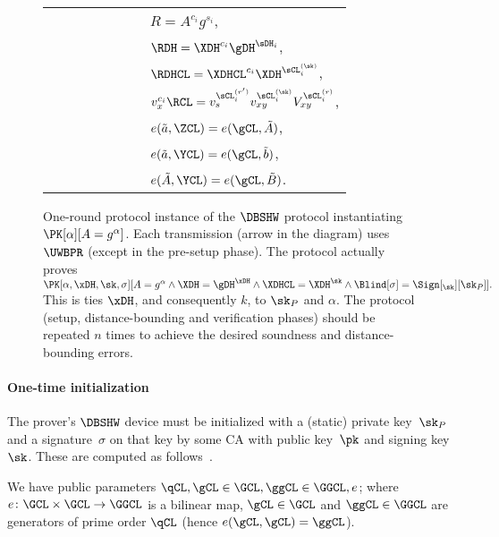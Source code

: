 \begin{figure*}
\begin{tabular}{p{0.40\linewidth}cp{0.40\linewidth}}
    &
    & \(R = A^{c_i} g^{s_i}\),
    \\

    &
    & \(\RDH = \XDH^{c_i} \gDH^{\sDH_i}\),
    \\

    &
    & \(\RDHCL = \XDHCL^{c_i} \XDH^{\sCL_i^{(\sk)}}\),
    \\

    &
    & \(v_x^{c_i} \RCL =
          v_s^{\sCL_i^{(r')}} v_{xy}^{\sCL_i^{(\sk)}} V_{xy}^{\sCL_i^{(r)}}\),
    \\

    &
    & \(e(\tilde a, \ZCL) = e(\gCL, \tilde A)\),
    \\

    &
    & \(e(\tilde a, \YCL) = e(\gCL, \tilde b)\),
    \\

    &
    & \(e(\tilde A, \YCL) = e(\gCL, \tilde B)\).
    \\

  \end{tabular}
  \caption{%
    One-round protocol instance of the \(\DBSHW\) protocol instantiating 
    \(\PK[\alpha][A = g^\alpha]\).
    Each transmission (arrow in the diagram) uses \(\UWBPR\) (except in the 
    pre-setup phase).
    The protocol actually proves \(
      \PK[\alpha, \xDH, \sk, \sigma][
        A = g^\alpha \land
        \XDH = \gDH^{\xDH} \land
        \XDHCL = \XDH^{\sk} \land
        \Blind[\sigma] = \Sign[_{\sk}][\sk_P]
      ].
    \)
    This is ties \(\xDH\), and consequently \(k\), to \(\sk_P\) and \(\alpha\).
    The protocol (setup, distance-bounding and verification phases) should be 
    repeated \(n\) times to achieve the desired soundness and distance-bounding 
    errors.
  }%
  \label{DBSHW-overview}
\end{figure*}

\paragraph*{One-time initialization}

The prover's \(\DBSHW\) device must be initialized with a (static) private 
key~\(\sk_P\) and a signature~\(\sigma\) on that key by some \ac{CA} with 
public key~\(\pk\) and signing key~\(\sk\).
These are computed as follows~\cite[cf.][Sect.~4.2]{CLsignatures}.

We have public parameters \(\qCL, \gCL\in\GCL, \ggCL\in\GGCL, e\); where 
\(e\colon \GCL\times \GCL\to \GGCL\) is a bilinear map, \(\gCL\in \GCL\) and 
\(\ggCL\in \GGCL\) are generators of prime order \(\qCL\) (hence \(e(\gCL, 
\gCL) = \ggCL\)).

